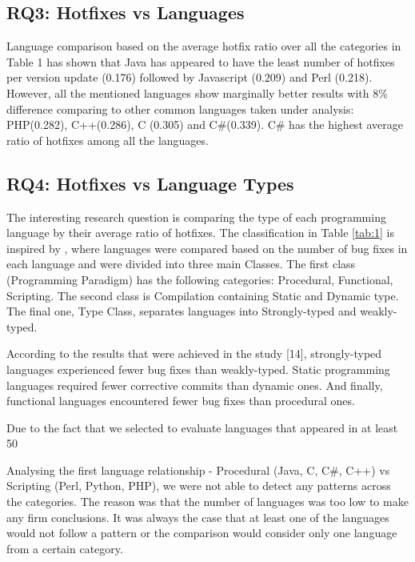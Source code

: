 \documentclass{sig-alternate}
\begin{document}
\subsection{RQ3: Hotfixes vs Languages}
Language comparison based on the average hotfix ratio over all the categories in Table 1 has shown that Java has appeared to have the least number of hotfixes per version update (0.176) followed by Javascript (0.209) and Perl (0.218). However, all the mentioned languages show marginally better results with 8\% difference comparing to other common languages taken under analysis: PHP(0.282), C++(0.286), C (0.305) and C\#(0.339). C\# has the highest average ratio of hotfixes among all the languages.

\subsection{RQ4: Hotfixes vs Language Types}
The interesting research question is comparing the type of each programming language by their average ratio of hotfixes. The classification in Table \ref{tab:1} is inspired by \cite{Ray2014}, where languages were compared based on the number of bug fixes in each language and were divided into three main Classes. The first class (Programming Paradigm) has the following categories: Procedural, Functional, Scripting. The second class is Compilation containing Static and Dynamic type. The final one, Type Class, separates languages into Strongly-typed and weakly-typed.

According to the results that were achieved in the study [14], strongly-typed languages experienced fewer bug fixes than weakly-typed. Static programming languages required fewer corrective commits than dynamic ones. And finally, functional languages encountered fewer bug fixes than procedural ones.

Due to the fact that we selected to evaluate languages that appeared in at least 50%

Analysing the first language relationship - Procedural (Java, C, C\#, C++) vs Scripting (Perl, Python, PHP), we were not able to detect any patterns across the categories. The reason was that the number of languages was too low to make any firm conclusions. It was always the case that at least one of the languages would not follow a pattern or the comparison would consider only one language from a certain category.
\end{document}

